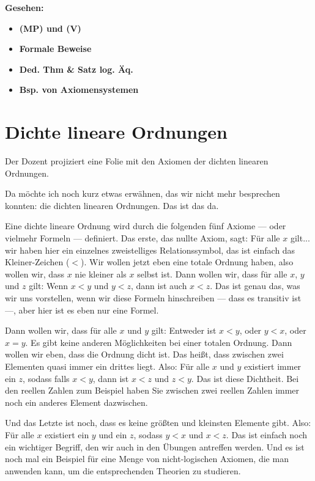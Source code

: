 \begin{math-stroke}
\textbf{Gesehen:}
\begin{itemize}
    \item \textbf{(MP) und (V)}
    \item \textbf{Formale Beweise}
    \item \textbf{Ded. Thm \& Satz log. Äq.}
    \item \textbf{Bsp. von Axiomensystemen}
\end{itemize}
\end{math-stroke}

\section{Dichte lineare Ordnungen}

\begin{meta-note}
Der Dozent projiziert eine Folie mit den Axiomen der dichten linearen Ordnungen.
\end{meta-note}

\begin{spoken-clean}[00:01:42 - 00:04:20]
Da möchte ich noch kurz etwas erwähnen, das wir nicht mehr besprechen konnten: die dichten linearen Ordnungen. Das ist das da.

Eine dichte lineare Ordnung wird durch die folgenden fünf Axiome --- oder vielmehr Formeln --- definiert. Das erste, das nullte Axiom, sagt: Für alle $x$ gilt... wir haben hier ein einzelnes zweistelliges Relationssymbol, das ist einfach das Kleiner-Zeichen ($<$). Wir wollen jetzt eben eine totale Ordnung haben, also wollen wir, dass $x$ nie kleiner als $x$ selbst ist. Dann wollen wir, dass für alle $x$, $y$ und $z$ gilt: Wenn $x < y$ und $y < z$, dann ist auch $x < z$. Das ist genau das, was wir uns vorstellen, wenn wir diese Formeln hinschreiben --- dass es transitiv ist ---, aber hier ist es eben nur eine Formel.

Dann wollen wir, dass für alle $x$ und $y$ gilt: Entweder ist $x < y$, oder $y < x$, oder $x = y$. Es gibt keine anderen Möglichkeiten bei einer totalen Ordnung. Dann wollen wir eben, dass die Ordnung dicht ist. Das heißt, dass zwischen zwei Elementen quasi immer ein drittes liegt. Also: Für alle $x$ und $y$ existiert immer ein $z$, sodass falls $x < y$, dann ist $x < z$ und $z < y$. Das ist diese Dichtheit. Bei den reellen Zahlen zum Beispiel haben Sie zwischen zwei reellen Zahlen immer noch ein anderes Element dazwischen.

Und das Letzte ist noch, dass es keine größten und kleinsten Elemente gibt. Also: Für alle $x$ existiert ein $y$ und ein $z$, sodass $y < x$ und $x < z$. Das ist einfach noch ein wichtiger Begriff, den wir auch in den Übungen antreffen werden. Und es ist noch mal ein Beispiel für eine Menge von nicht-logischen Axiomen, die man anwenden kann, um die entsprechenden Theorien zu studieren.
\end{spoken-clean}

